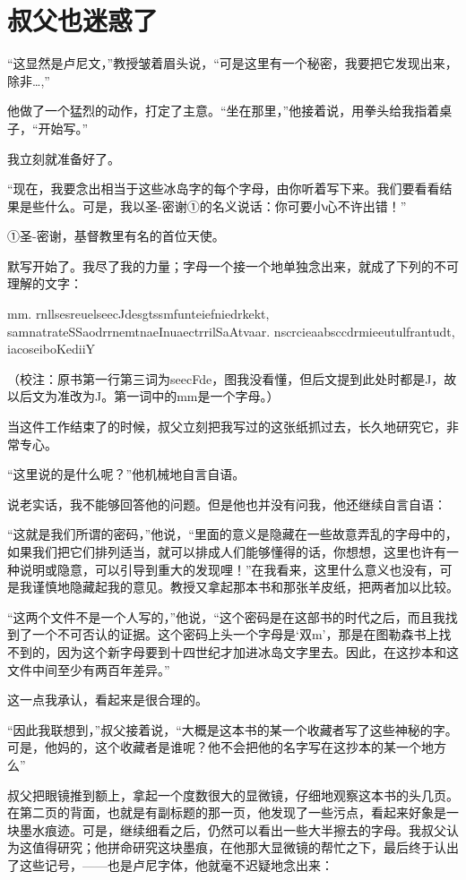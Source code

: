 \documentclass[10pt]{book}
\begin{document}
\chapter{叔父也迷惑了}
“这显然是卢尼文，”教授皱着眉头说，“可是这里有一个秘密，我要把它发现出来，除非…,”

他做了一个猛烈的动作，打定了主意。“坐在那里，”他接着说，用拳头给我指着桌子，“开始写。”

我立刻就准备好了。

“现在，我要念出相当于这些冰岛字的每个字母，由你听着写下来。我们要看看结果是些什么。可是，我以圣-密谢①的名义说话：你可要小心不许出错！”

①圣-密谢，基督教里有名的首位天使。

默写开始了。我尽了我的力量；字母一个接一个地单独念出来，就成了下列的不可理解的文字：

mm. rnllsesreuelseecJdesgtssmfunteiefniedrkekt, samnatrateSSaodrrnemtnaeInuaectrrilSaAtvaar. nscrcieaabsccdrmieeutulfrantudt, iacoseiboKediiY

（校注：原书第一行第三词为seecFde，图我没看懂，但后文提到此处时都是J，故以后文为准改为J。第一词中的mm是一个字母。）

当这件工作结束了的时候，叔父立刻把我写过的这张纸抓过去，长久地研究它，非常专心。

“这里说的是什么呢？”他机械地自言自语。

说老实话，我不能够回答他的问题。但是他也并没有问我，他还继续自言自语：

“这就是我们所谓的密码，”他说，“里面的意义是隐藏在一些故意弄乱的字母中的，如果我们把它们排列适当，就可以排成人们能够懂得的话，你想想，这里也许有一种说明或隐意，可以引导到重大的发现哩！”在我看来，这里什么意义也没有，可是我谨慎地隐藏起我的意见。教授又拿起那本书和那张羊皮纸，把两者加以比较。

“这两个文件不是一个人写的，”他说，“这个密码是在这部书的时代之后，而且我找到了一个不可否认的证据。这个密码上头一个字母是‘双m’，那是在图勒森书上找不到的，因为这个新字母要到十四世纪才加进冰岛文字里去。因此，在这抄本和这文件中间至少有两百年差异。”

这一点我承认，看起来是很合理的。

“因此我联想到，”叔父接着说，“大概是这本书的某一个收藏者写了这些神秘的字。可是，他妈的，这个收藏者是谁呢？他不会把他的名字写在这抄本的某一个地方么”

叔父把眼镜推到额上，拿起一个度数很大的显微镜，仔细地观察这本书的头几页。在第二页的背面，也就是有副标题的那一页，他发现了一些污点，看起来好象是一块墨水痕迹。可是，继续细看之后，仍然可以看出一些大半擦去的字母。我叔父认为这值得研究；他拼命研究这块墨痕，在他那大显微镜的帮忙之下，最后终于认出了这些记号，——也是卢尼字体，他就毫不迟疑地念出来：
\end{document}
